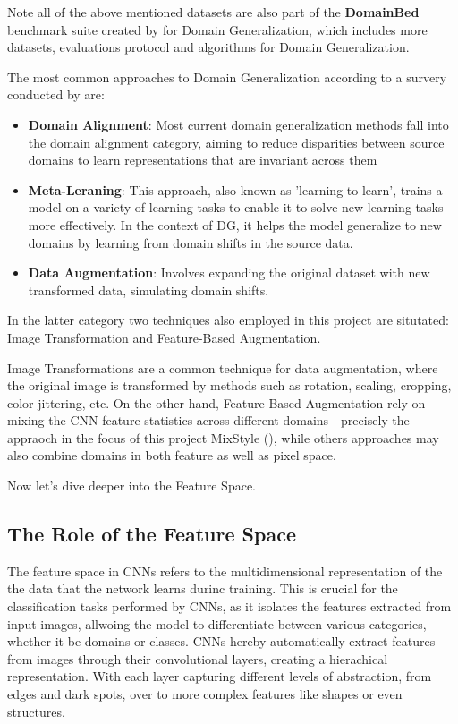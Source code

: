 Note all of the above mentioned datasets are also part of the \textbf{DomainBed} benchmark suite created by \cite{gulrajaniSearchLostDomain2020} for Domain Generalization, which includes more datasets, evaluations protocol and algorithms for Domain Generalization.




The most common approaches to Domain Generalization according to a survery conducted by \cite{zhouDomainGeneralizationSurvey2022} are:
\begin{itemize}
 \item \textbf{Domain Alignment}: Most current domain generalization methods fall into the domain alignment category, aiming to reduce disparities between source domains to learn representations that are invariant across them
 \item \textbf{Meta-Leraning}: This approach, also known as 'learning to learn', trains a model on a variety of learning tasks to enable it to solve new learning tasks more effectively. In the context of DG, it helps the model generalize to new domains by learning from domain shifts in the source data.
 \item \textbf{Data Augmentation}: Involves expanding the original dataset with new transformed data, simulating domain shifts.
\end{itemize}

In the latter category two techniques also employed in this project are situtated:
Image Transformation and Feature-Based Augmentation.

Image Transformations are a common technique for data augmentation, where the original image is transformed by methods such as rotation, scaling, cropping, color jittering, etc.
On the other hand, Feature-Based Augmentation rely on mixing the CNN feature statistics across different domains - precisely the appraoch in the focus of this project MixStyle (\cite{zhouMixStyleNeuralNetworks2023}), while others approaches may also combine domains in both feature as well as pixel space.

Now let's dive deeper into the Feature Space.
\subsection{The Role of the Feature Space}
The feature space in CNNs refers to the multidimensional representation of the the data that the network learns durinc training. This is crucial for the classification tasks performed by CNNs, as it isolates the features extracted from input images, allwoing the model to differentiate between various categories, whether it be domains or classes. CNNs hereby automatically extract features from images through their convolutional layers, creating a hierachical representation. With each layer capturing different levels of abstraction, from edges and dark spots, over to more complex features like shapes or even structures. \cite{zeilerVisualizingUnderstandingConvolutional2013,goodfellowDeepLearning2016}

